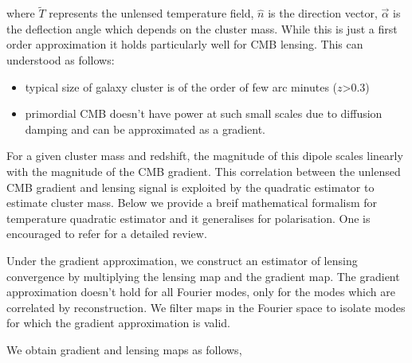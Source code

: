where $ \tilde{T}$ represents the unlensed temperature field, $\hat{n}$ is the direction vector, $\vec{\alpha}$ is the deflection angle which depends on the cluster mass.
While this is just a first order approximation it holds particularly well for CMB lensing. 
This can understood as follows:
\begin{itemize}
\item typical size of galaxy cluster is of the order of few arc minutes ($z$>0.3)
\item primordial CMB doesn't have power at such small scales due to diffusion damping \cite{Silk} and can be approximated as a gradient. 
\end{itemize}
For a given cluster mass and redshift, the magnitude of this dipole scales linearly with the magnitude of the CMB gradient.
This correlation between the unlensed CMB gradient and lensing signal is exploited by the quadratic estimator to estimate cluster mass.
Below we provide a breif mathematical formalism for temperature quadratic estimator and it generalises for polarisation. One is encouraged to refer \cite{hu02} for a detailed review.

 Under the gradient approximation, we construct an estimator of lensing convergence by multiplying the lensing map and the gradient map.
The gradient approximation doesn't hold for all Fourier modes, only for the modes which are correlated by reconstruction.
We filter maps in the Fourier space to isolate modes for which the gradient approximation is valid.
 
 We obtain gradient and lensing maps as follows,
 
